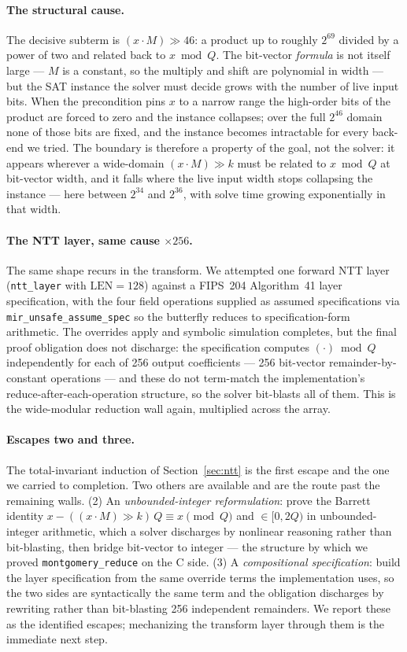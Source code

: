 \documentclass[11pt]{article}
\newcommand{\code}[1]{\texttt{#1}}
\begin{document}
\paragraph{The structural cause.} The decisive subterm is $(x \cdot M) \gg 46$: a product up to roughly
$2^{69}$ divided by a power of two and related back to $x \bmod Q$. The bit-vector \emph{formula} is not
itself large --- $M$ is a constant, so the multiply and shift are polynomial in width --- but the SAT
instance the solver must decide grows with the number of live input bits. When the precondition pins $x$
to a narrow range the high-order bits of the product are forced to zero and the instance collapses; over
the full $2^{46}$ domain none of those bits are fixed, and the instance becomes intractable for every
back-end we tried. The boundary is therefore a property of the goal, not the solver: it appears wherever
a wide-domain $(x \cdot M) \gg k$ must be related to $x \bmod Q$ at bit-vector width, and it falls where
the live input width stops collapsing the instance --- here between $2^{34}$ and $2^{36}$, with solve
time growing exponentially in that width.

\paragraph{The NTT layer, same cause $\times 256$.} The same shape recurs in the transform. We attempted
one forward NTT layer (\code{ntt\_layer} with $\mathrm{LEN}=128$) against a FIPS~204 Algorithm~41 layer
specification, with the four field operations supplied as assumed specifications via
\code{mir\_unsafe\_assume\_spec} so the butterfly reduces to specification-form arithmetic. The overrides
apply and symbolic simulation completes, but the final proof obligation does not discharge: the
specification computes $(\cdot) \bmod Q$ independently for each of 256 output coefficients ---
256 bit-vector remainder-by-constant operations --- and these do not term-match the implementation's
reduce-after-each-operation structure, so the solver bit-blasts all of them. This is the wide-modular
reduction wall again, multiplied across the array.

\paragraph{Escapes two and three.} The total-invariant induction of Section~\ref{sec:ntt} is the first
escape and the one we carried to completion. Two others are available and are the route past the
remaining walls. (2) An \emph{unbounded-integer reformulation}: prove the Barrett identity
$x - ((x \cdot M)\gg k)\,Q \equiv x \pmod Q$ and $\in [0, 2Q)$ in unbounded-integer arithmetic, which a
solver discharges by nonlinear reasoning rather than bit-blasting, then bridge bit-vector to integer ---
the structure by which we proved \code{montgomery\_reduce} on the C side. (3) A \emph{compositional
specification}: build the layer specification from the same override terms the implementation uses, so
the two sides are syntactically the same term and the obligation discharges by rewriting rather than
bit-blasting 256 independent remainders. We report these as the identified escapes; mechanizing the
transform layer through them is the immediate next step.
\end{document}
